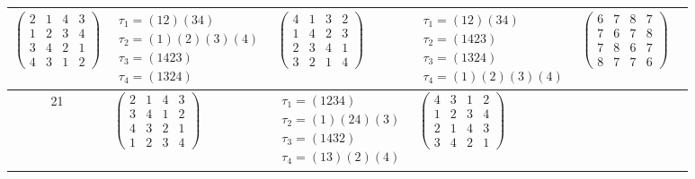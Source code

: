 \begin{longtable}{|c|p{2.7cm}|p{2.7cm}|p{2.7cm}|p{2.7cm}|p{2.7cm}|}
    $\begin{pmatrix} 2 & 1 & 4 & 3 \\ 1 & 2 & 3 & 4 \\ 3 & 4 & 2 & 1 \\ 4 & 3 & 1 & 2 \end{pmatrix}$               &
    $\begin{array}{l}\tau_{1}=(12)(34)\\ \tau_{2}=(1)(2)(3)(4)\\ \tau_{3}=(1423)\\ \tau_{4}=(1324)\end{array}$     &
    $\begin{pmatrix} 4 & 1 & 3 & 2 \\ 1 & 4 & 2 & 3 \\ 2 & 3 & 4 & 1 \\ 3 & 2 & 1 & 4 \end{pmatrix}$               &
    $\begin{array}{l}\tau_{1}=(12)(34)\\ \tau_{2}=(1423)\\ \tau_{3}=(1324)\\ \tau_{4}=(1)(2)(3)(4)\end{array}$     &
    $\begin{pmatrix} 6 & 7 & 8 & 7 \\ 7 & 6 & 7 & 8 \\ 7 & 8 & 6 & 7 \\ 8 & 7 & 7 & 6 \end{pmatrix}$                                                                                           \\
    \hline
    21                                                                                                             &
    $\begin{pmatrix} 2 & 1 & 4 & 3 \\ 3 & 4 & 1 & 2 \\ 4 & 3 & 2 & 1 \\ 1 & 2 & 3 & 4 \end{pmatrix}$               &
    $\begin{array}{l}\tau_{1}=(1234)\\ \tau_{2}=(1)(24)(3)\\ \tau_{3}=(1432)\\ \tau_{4}=(13)(2)(4)\end{array}$     &
    $\begin{pmatrix} 4 & 3 & 1 & 2 \\ 1 & 2 & 3 & 4 \\ 2 & 1 & 4 & 3 \\ 3 & 4 & 2 & 1 \end{pmatrix}$               &

\end{longtable}
